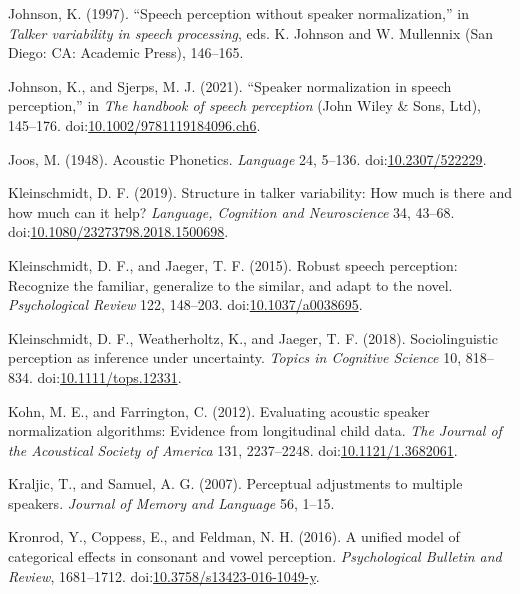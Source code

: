 \documentclass[utf8]{frontiersSCNS}
\newlength{\cslhangindent}
\newlength{\cslentryspacingunit} %
\newenvironment{CSLReferences}[2] %
 {%
  \setlength{\parindent}{0pt}
  \ifodd #1
  \let\oldpar\par
  \def\par{\hangindent=\cslhangindent\oldpar}
  \fi
  \setlength{\parskip}{#2\cslentryspacingunit}
 }%
 {}
\begin{document}
\begin{CSLReferences}{1}{0}
\leavevmode{}%
Johnson, K. (1997). {``Speech perception without speaker normalization,''} in \emph{Talker variability in speech processing}, eds. K. Johnson and W. Mullennix ({San Diego}: {CA: Academic Press}), 146--165.

\leavevmode{}%
Johnson, K., and Sjerps, M. J. (2021). {``Speaker normalization in speech perception,''} in \emph{The handbook of speech perception} ({John Wiley \& Sons, Ltd}), 145--176. doi:\href{https://doi.org/10.1002/9781119184096.ch6}{10.1002/9781119184096.ch6}.

\leavevmode{}%
Joos, M. (1948). Acoustic {Phonetics}. \emph{Language} 24, 5--136. doi:\href{https://doi.org/10.2307/522229}{10.2307/522229}.

\leavevmode{}%
Kleinschmidt, D. F. (2019). Structure in talker variability: {How} much is there and how much can it help? \emph{Language, Cognition and Neuroscience} 34, 43--68. doi:\href{https://doi.org/10.1080/23273798.2018.1500698}{10.1080/23273798.2018.1500698}.

\leavevmode{}%
Kleinschmidt, D. F., and Jaeger, T. F. (2015). Robust speech perception: {Recognize} the familiar, generalize to the similar, and adapt to the novel. \emph{Psychological Review} 122, 148--203. doi:\href{https://doi.org/10.1037/a0038695}{10.1037/a0038695}.

\leavevmode{}%
Kleinschmidt, D. F., Weatherholtz, K., and Jaeger, T. F. (2018). Sociolinguistic perception as inference under uncertainty. \emph{Topics in Cognitive Science} 10, 818--834. doi:\href{https://doi.org/10.1111/tops.12331}{10.1111/tops.12331}.

\leavevmode{}%
Kohn, M. E., and Farrington, C. (2012). Evaluating acoustic speaker normalization algorithms: {Evidence} from longitudinal child data. \emph{The Journal of the Acoustical Society of America} 131, 2237--2248. doi:\href{https://doi.org/10.1121/1.3682061}{10.1121/1.3682061}.

\leavevmode{}%
Kraljic, T., and Samuel, A. G. (2007). Perceptual adjustments to multiple speakers. \emph{Journal of Memory and Language} 56, 1--15.

\leavevmode{}%
Kronrod, Y., Coppess, E., and Feldman, N. H. (2016). A unified model of categorical effects in consonant and vowel perception. \emph{Psychological Bulletin and Review}, 1681--1712. doi:\href{https://doi.org/10.3758/s13423-016-1049-y}{10.3758/s13423-016-1049-y}.


\end{CSLReferences}
\end{document}
